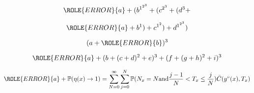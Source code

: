 \documentclass{article}
\begin{document}
\[ \ROLE{ERROR}{a} + (b^{1^{2^3}}  +  (c^{2^3}  + (d^3  +  \]

\[ \ROLE{ERROR}{a} +  b^1) +  c^{1^2}) + d^{1^{2^3}})  \]

\[ (a  + \ROLE{ERROR}{b})^3 \]

\[ \ROLE{ERROR}{a} + (b + (c+d)^2+e)^3 + (f + (g+h)^2+i)^3
\]

\[\ROLE{ERROR}{a} +
 \mathbb P(\eta(x) \to 1) = \sum_{N=0}^\infty \sum_{j=0}^N \mathbb P(N_x=N \mathrm{ and } \frac{j-1}N<T_x\leq\frac{j}N) \bar C(y^\circ(x), T_x)
\]
\end{document}
